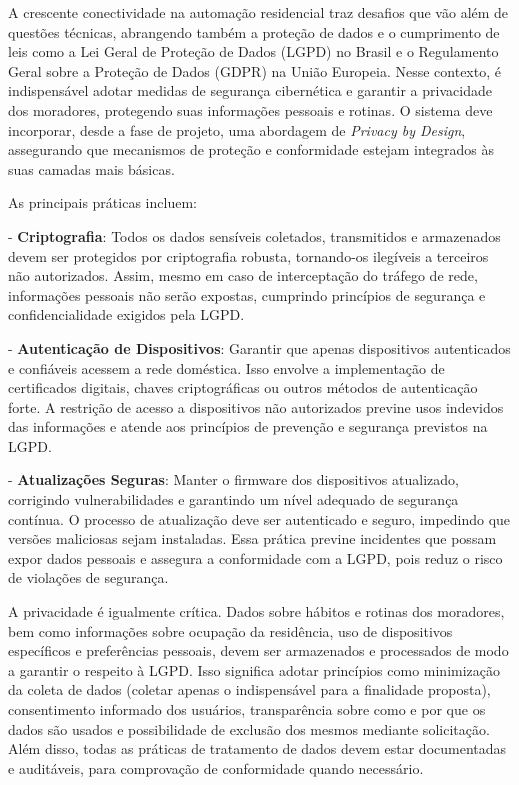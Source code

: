 A crescente conectividade na automação residencial traz desafios que vão além de questões técnicas, abrangendo também a proteção de dados e o cumprimento de leis como a Lei Geral de Proteção de Dados (LGPD) no Brasil e o Regulamento Geral sobre a Proteção de Dados (GDPR) na União Europeia. Nesse contexto, é indispensável adotar medidas de segurança cibernética e garantir a privacidade dos moradores, protegendo suas informações pessoais e rotinas. O sistema deve incorporar, desde a fase de projeto, uma abordagem de \textit{Privacy by Design}, assegurando que mecanismos de proteção e conformidade estejam integrados às suas camadas mais básicas.

As principais práticas incluem:

- \textbf{Criptografia}: Todos os dados sensíveis coletados, transmitidos e armazenados devem ser protegidos por criptografia robusta, tornando-os ilegíveis a terceiros não autorizados. Assim, mesmo em caso de interceptação do tráfego de rede, informações pessoais não serão expostas, cumprindo princípios de segurança e confidencialidade exigidos pela LGPD.

- \textbf{Autenticação de Dispositivos}: Garantir que apenas dispositivos autenticados e confiáveis acessem a rede doméstica. Isso envolve a implementação de certificados digitais, chaves criptográficas ou outros métodos de autenticação forte. A restrição de acesso a dispositivos não autorizados previne usos indevidos das informações e atende aos princípios de prevenção e segurança previstos na LGPD.

- \textbf{Atualizações Seguras}: Manter o firmware dos dispositivos atualizado, corrigindo vulnerabilidades e garantindo um nível adequado de segurança contínua. O processo de atualização deve ser autenticado e seguro, impedindo que versões maliciosas sejam instaladas. Essa prática previne incidentes que possam expor dados pessoais e assegura a conformidade com a LGPD, pois reduz o risco de violações de segurança.

A privacidade é igualmente crítica. Dados sobre hábitos e rotinas dos moradores, bem como informações sobre ocupação da residência, uso de dispositivos específicos e preferências pessoais, devem ser armazenados e processados de modo a garantir o respeito à LGPD. Isso significa adotar princípios como minimização da coleta de dados (coletar apenas o indispensável para a finalidade proposta), consentimento informado dos usuários, transparência sobre como e por que os dados são usados e possibilidade de exclusão dos mesmos mediante solicitação. Além disso, todas as práticas de tratamento de dados devem estar documentadas e auditáveis, para comprovação de conformidade quando necessário.

